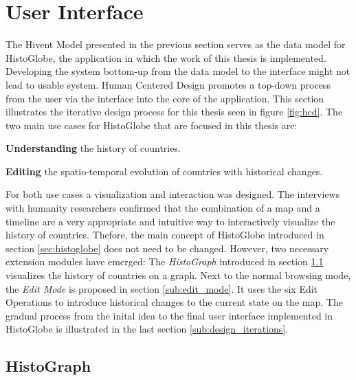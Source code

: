 
\section{User Interface} %
\label{sec:user_interface}

The Hivent Model presented in the previous section serves as the data model for HistoGlobe, the application in which the work of this thesis is implemented. Developing the system bottom-up from the data model to the interface might not lead to usable system. Human Centered Design promotes a top-down process from the user via the interface into the core of the application. This section illustrates the iterative design process for this thesis seen in figure \ref{fig:hcd}. The two main use cases for HistoGlobe that are focused in this thesis are:

\begin{compactenum}
  \item \textbf{Understanding} the history of countries.
  \item \textbf{Editing} the spatio-temporal evolution of countries with historical changes.
\end{compactenum}

For both use cases a visualization and interaction was designed. The interviews with humanity researchers confirmed that the combination of a map and a timeline are a very appropriate and intuitive way to interactively visualize the history of countries. Thefore, the main concept of HistoGlobe introduced in section \ref{sec:histoglobe} does not need to be changed. However, two necessary extension modules have emerged: The \emph{HistoGraph} introduced in section \ref{sub:histograph} visualizes the history of countries on a graph. Next to the normal browsing mode, the \emph{Edit Mode} is proposed in section \ref{sub:edit_mode}. It uses the six Edit Operations to introduce historical changes to the current state on the map. The gradual process from the inital idea to the final user interface implemented in HistoGlobe is illustrated in the last section \ref{sub:design_iterations}.

\subsection{HistoGraph} %
\label{sub:histograph}

